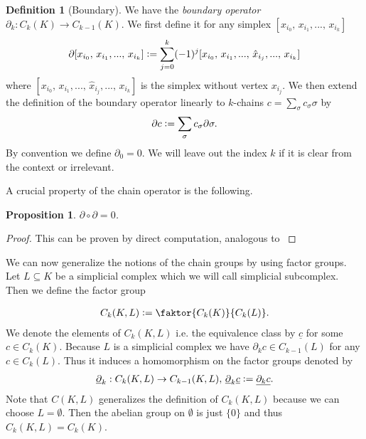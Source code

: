 \documentclass[12pt,a4paper]{article}
\numberwithin{equation}{subsection}
\numberwithin{lemma}{subsection}
\newtheorem{proposition}[lemma]{Proposition}
\theoremstyle{definition}
\newtheorem{definition}[lemma]{Definition}
\begin{document}
\begin{definition}[Boundary]
    We have the 
    \textit{boundary operator} $\partial_k: C_k(K) \rightarrow C_{k-1}(K)$.
    We first define it
    for any simplex $[x_{i_0},\, x_{i_1},...,\, x_{i_k}]$ 
    \begin{align*}
        \partial[x_{i_0},\, x_{i_1},...,\, x_{i_k}] \vcentcolon=
        \sum\limits_{j=0}^k (-1)^j [x_{i_0},\, x_{i_1},...,\, 
        \hat{x}_{i_j},...,\, x_{i_k}]
    \end{align*}
    where $[x_{i_0},\, x_{i_1},...,\, \hat{x}_{i_j},...,\, x_{i_k}]$ is the
    simplex without vertex $x_{i_j}$. We then extend the definition
    of the boundary operator linearly to $k$-chains 
    $c = \sum_\sigma c_\sigma \sigma$ by
    \begin{align*}
        \partial c \vcentcolon= \sum\limits_\sigma c_\sigma \partial \sigma.
    \end{align*}
    By convention we define $\partial_0 = 0$. We will leave out the index $k$
    if it is clear from the context or irrelevant.
\end{definition}

A crucial property of the chain operator is the following.

\begin{proposition}
    $\partial \circ \partial = 0$.
\end{proposition}
\begin{proof}
    This can be proven by direct computation, analogous to 
    \cite[Chap.~4, Lemma~1.6]{topology_and_geometry}
\end{proof}

We can now generalize the notions of the chain groups by using factor groups.
Let $L \subseteq K$ be a simplicial complex which we will call simplicial
subcomplex. Then we define the factor group

\begin{align*}
    C_k(K,L) \vcentcolon= \faktor{C_k(K)}{C_k(L)}.
\end{align*}
We denote the elements of $C_k(K,L)$ i.e. the equivalence class 
by $\underline{c}$ for some $c \in C_k(K)$. 
Because $L$ is a simplicial complex we have $\partial_k c \in C_{k-1}(L)$ for
any $c \in C_k(L)$. Thus it induces a homomorphism on the factor groups denoted
by
\begin{align*}
    \underline{\partial}_k: C_k(K,L) \rightarrow C_{k-1}(K,L),\,
    \underline{\partial}_k \underline{c} \vcentcolon= \underline{\partial_k c}.
\end{align*}
Note that $C(K,L)$ generalizes the definition of $C_k(K,L)$ because we 
can choose $L = \emptyset$. Then the abelian group on $\emptyset$ is just 
$\{ 0 \}$ and thus $C_k(K,L) = C_k(K)$.
\end{document}
